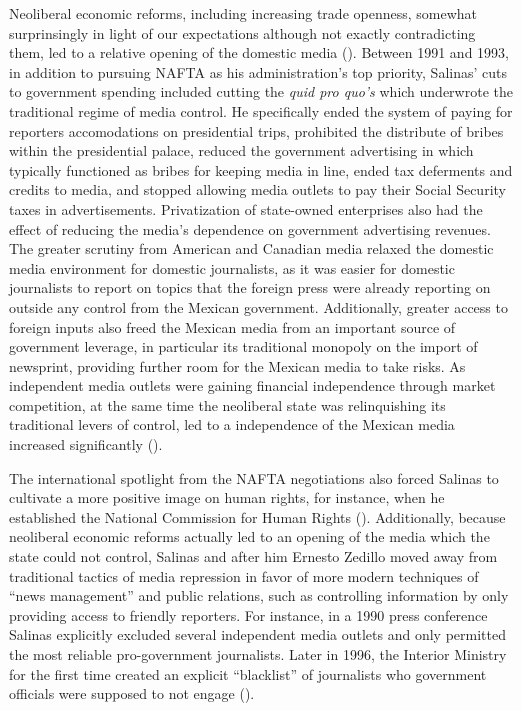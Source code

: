 \documentclass[12pt]{report}
\begin{document}
Neoliberal economic reforms, including increasing trade openness, somewhat surprinsingly in light of
our expectations although not exactly contradicting them, led to a relative opening of the domestic
media (\citealt{lawson2002building}). Between 1991 and 1993, in addition to pursuing NAFTA as his
administration's top priority, Salinas' cuts to government spending included cutting the \emph{quid
pro quo's }which underwrote the traditional regime of media control. He specifically ended the
system of paying for reporters accomodations on presidential trips, prohibited the distribute of
bribes within the presidential palace, reduced the government advertising in which typically
functioned as bribes for keeping media in line, ended tax deferments and credits to media, and
stopped allowing media outlets to pay their Social Security taxes in advertisements. Privatization
of state-owned enterprises also had the effect of reducing the media's dependence on government
advertising revenues. The greater scrutiny from American and Canadian media relaxed the domestic
media environment for domestic journalists, as it was easier for domestic journalists to report on
topics that the foreign press were already reporting on outside any control from the Mexican
government. Additionally, greater access to foreign inputs also freed the Mexican media from an
important source of government leverage, in particular its traditional monopoly on the import of
newsprint, providing further room for the Mexican media to take risks. As independent media outlets
were gaining financial independence through market competition, at the same time the neoliberal
state was relinquishing its traditional levers of control, led to a independence of the Mexican
media increased significantly (\citealt[76, 89]{lawson2002building}).

The international spotlight from the NAFTA negotiations also forced Salinas to cultivate a more
positive image on human rights, for instance, when he established the National Commission for Human
Rights (\citealt[107]{Dominguez:2009wd}). Additionally, because neoliberal economic reforms actually
led to an opening of the media which the state could not control, Salinas and after him Ernesto
Zedillo moved away from traditional tactics of media repression in favor of more modern techniques
of ``news management'' and public relations, such as controlling information by only providing
access to friendly reporters. For instance, in a 1990 press conference Salinas explicitly excluded
several independent media outlets and only permitted the most reliable pro-government journalists.
Later in 1996, the Interior Ministry for the first time created an explicit ``blacklist'' of
journalists who government officials were supposed to not engage (\citealt[39]{lawson2002building}).
\end{document}
